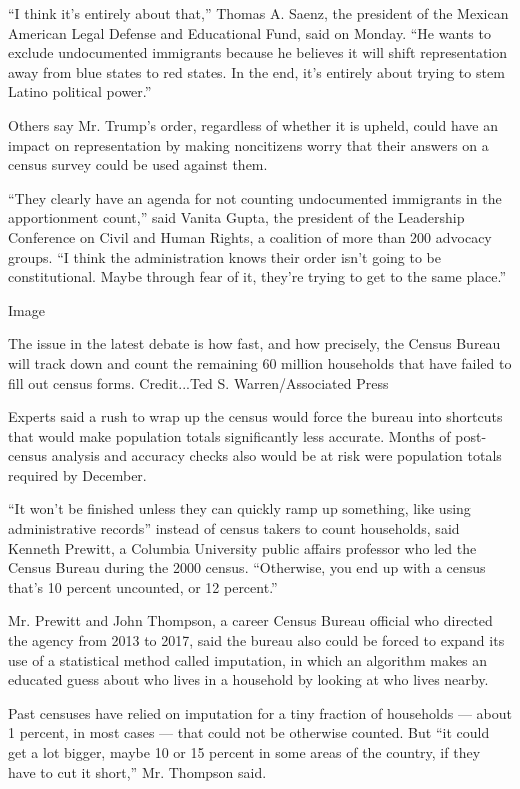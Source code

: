 ``I think it's entirely about that,'' Thomas A. Saenz, the president of
the Mexican American Legal Defense and Educational Fund, said on Monday.
``He wants to exclude undocumented immigrants because he believes it
will shift representation away from blue states to red states. In the
end, it's entirely about trying to stem Latino political power.''

Others say Mr. Trump's order, regardless of whether it is upheld, could
have an impact on representation by making noncitizens worry that their
answers on a census survey could be used against them.

``They clearly have an agenda for not counting undocumented immigrants
in the apportionment count,'' said Vanita Gupta, the president of the
Leadership Conference on Civil and Human Rights, a coalition of more
than 200 advocacy groups. ``I think the administration knows their order
isn't going to be constitutional. Maybe through fear of it, they're
trying to get to the same place.''

Image

The issue in the latest debate is how fast, and how precisely, the
Census Bureau will track down and count the remaining 60 million
households that have failed to fill out census forms. Credit...Ted S.
Warren/Associated Press

Experts said a rush to wrap up the census would force the bureau into
shortcuts that would make population totals significantly less accurate.
Months of post-census analysis and accuracy checks also would be at risk
were population totals required by December.

``It won't be finished unless they can quickly ramp up something, like
using administrative records'' instead of census takers to count
households, said Kenneth Prewitt, a Columbia University public affairs
professor who led the Census Bureau during the 2000 census. ``Otherwise,
you end up with a census that's 10 percent uncounted, or 12 percent.''

Mr. Prewitt and John Thompson, a career Census Bureau official who
directed the agency from 2013 to 2017, said the bureau also could be
forced to expand its use of a statistical method called imputation, in
which an algorithm makes an educated guess about who lives in a
household by looking at who lives nearby.

Past censuses have relied on imputation for a tiny fraction of
households --- about 1 percent, in most cases --- that could not be
otherwise counted. But ``it could get a lot bigger, maybe 10 or 15
percent in some areas of the country, if they have to cut it short,''
Mr. Thompson said.

